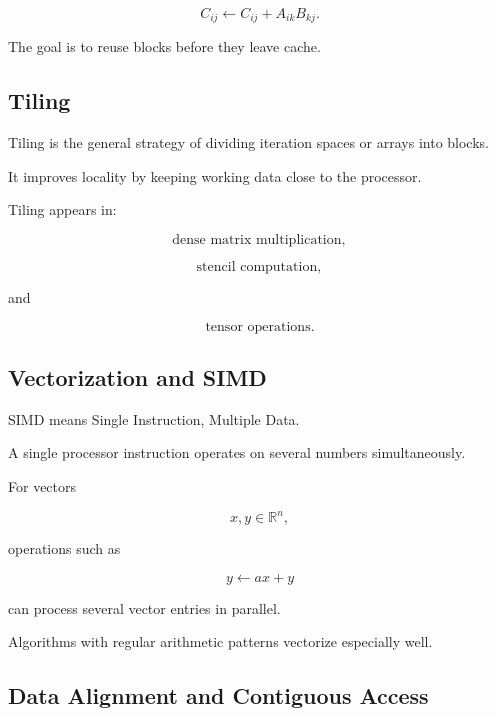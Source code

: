 \[
\boxed{
C_{ij}
\leftarrow
C_{ij}
+
A_{ik}B_{kj}.
}
\]

The goal is to reuse blocks before they leave cache.

\subsection{Tiling}
\label{subsec:hpmc-tiling}

Tiling is the general strategy of dividing iteration spaces or arrays into
blocks.

It improves locality by keeping working data close to the processor.

Tiling appears in:

\[
\boxed{
\text{dense matrix multiplication},
}
\]

\[
\boxed{
\text{stencil computation},
}
\]

and

\[
\boxed{
\text{tensor operations}.
}
\]

\subsection{Vectorization and SIMD}
\label{subsec:vectorization-simd}

SIMD means Single Instruction, Multiple Data.

A single processor instruction operates on several numbers simultaneously.

For vectors

\[
x,y\in\mathbb{R}^n,
\]

operations such as

\[
\boxed{
y
\leftarrow
ax+y
}
\]

can process several vector entries in parallel.

Algorithms with regular arithmetic patterns vectorize especially well.

\subsection{Data Alignment and Contiguous Access}
\label{subsec:contiguous-memory-access}

